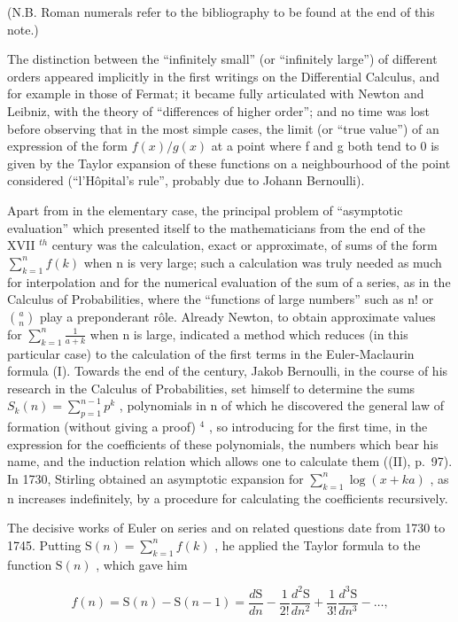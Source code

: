 (N.B. Roman numerals refer to the bibliography to be found at the end of this note.)

The distinction between the ``infinitely small'' (or ``infinitely large'') of different orders appeared implicitly in the first writings on the Differential Calculus, and for example in those of Fermat; it became fully articulated with Newton and Leibniz, with the theory of ``differences of higher order''; and no time was lost before observing that in the most simple cases, the limit (or ``true value'') of an expression of the form \(f(x)/g(x)\) at a point where f and g both tend to 0 is given by the Taylor expansion of these functions on a neighbourhood of the point considered (``l'Hôpital's rule'', probably due to Johann Bernoulli).

Apart from in the elementary case, the principal problem of ``asymptotic evaluation'' which presented itself to the mathematicians from the end of the XVII \(^{th}\) century was the calculation, exact or approximate, of sums of the form \(\sum_{k=1}^{n} f(k)\) when n is very large; such a calculation was truly needed as much for interpolation and for the numerical evaluation of the sum of a series, as in the Calculus of Probabilities, where the ``functions of large numbers'' such as n! or \(\binom{a}{n}\) play a preponderant rôle. Already Newton, to obtain approximate values for \(\sum_{k=1}^{n} \frac{1}{a+k}\) when n is large, indicated a method which reduces (in this particular case) to the calculation of the first terms in the Euler-Maclaurin formula (I). Towards the end of the century, Jakob Bernoulli, in the course of his research in the Calculus of Probabilities, set himself to determine the sums \(S_{k}(n) = \sum_{p=1}^{n-1} p^{k}\) , polynomials in n of which he discovered the general law of formation (without giving a proof) \(^{4}\) , so introducing for the first time, in the expression for the coefficients of these polynomials, the numbers which bear his name, and the induction relation which allows one to calculate them ((II), p.~97). In 1730, Stirling obtained an asymptotic expansion for \(\sum_{k=1}^{n} \log(x + ka)\) , as n increases indefinitely, by a procedure for calculating the coefficients recursively.

The decisive works of Euler on series and on related questions date from 1730 to 1745. Putting \(\mathrm{S}(n) = \sum_{k=1}^{n} f(k)\) , he applied the Taylor formula to the function \(\mathrm{S}(n)\) , which gave him

\[
f (n) = \mathrm{S} (n) - \mathrm{S} (n - 1) = \frac {d \mathrm{S}}{d n} - \frac {1}{2 !} \frac {d ^ {2} \mathrm{S}}{d n ^ {2}} + \frac {1}{3 !} \frac {d ^ {3} \mathrm{S}}{d n ^ {3}} - \dots ,
\]

